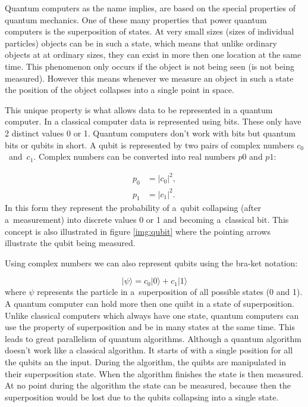 Quantum computers as the name implies, are based on the special properties of quantum mechanics. One of these many properties that power quantum computers is the superposition of states. At very small sizes (sizes of individual particles) objects can be in such a state, which means that unlike ordinary objects at at ordinary sizes, they can exist in more then one location at the same time. This phenomenon only occurs if the object is not being seen (is not being measured). However this means whenever we measure an object in such a state the position of the object collapses into a single point in space. \cite{Yanofsky2008}


This unique property is what allows data to be represented in a quantum computer. In a classical computer data is represented using bits. These only have 2 distinct values 0 or 1. Quantum computers don't work with bits but quantum bits or qubits in short. A qubit is represented by two pairs of complex numbers $c_0$~and~$c_1$. Complex numbers can be converted into real numbers $p0$ and $p1$:

\begin{equation}
  \begin{aligned}
    p_0 &= \lvert c_0 \rvert^2, \\
    p_1 &= \lvert c_1 \rvert^2.
  \end{aligned}  
\end{equation}
In this form they represent the probability of a~qubit collapsing (after a~measurement) into discrete values 0 or 1 and becoming a~classical bit. This concept is also illustrated in figure \ref{img:qubit} where the pointing arrows illustrate the qubit being measured. \cite{Yanofsky2008}\cite{Bernstein2009}

Using complex numbers we can also represent qubits using the bra-ket notation:

\begin{equation}
  \lvert\psi\rangle=c_0|0\rangle + c_1|1\rangle
\end{equation}
where $\psi$ represents the particle in a~superposition of all possible states (0 and 1). A quantum computer can hold more then one quibt in a state of superposition. Unlike classical computers which always have one state, quantum computers can use the property of superposition and be in many states at the same time. This leads to great parallelism of quantum algorithms. Although a quantum algorithm doesn't work like a classical algorithm. It starts of with a single position for all the qubits an the input. During the algorithm, the quibts are manipulated in their superposition state. When the algorithm finishes the state is then measured. At no point during the algorithm the state can be measured, because then the superposition would be lost due to the  qubits collapsing into a single state. \cite{Yanofsky2008} 
